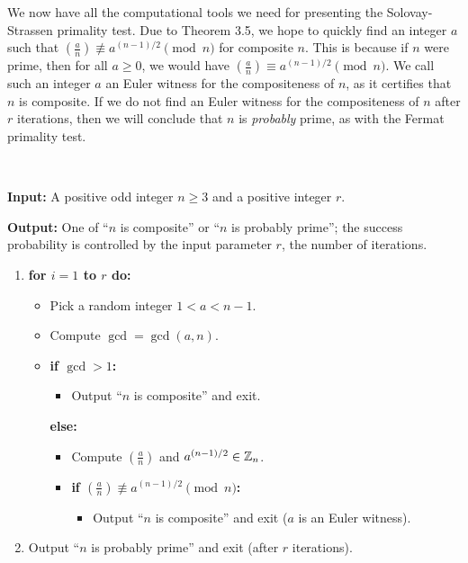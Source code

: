 We now have all the computational tools we need for presenting the Solovay-Strassen primality test. 
Due to Theorem 3.5, we hope to quickly find an integer $a$ such that $\left(\frac an \right) 
\not\equiv a^{(n-1)/2} \pmod n$ for composite $n$. This is because if $n$ were prime, then
for all $a \geq 0$, we would have $\left( \frac an \right) \equiv a^{(n-1)/2} \pmod n$.
We call such an integer $a$ an Euler witness for 
the compositeness of $n$, as it certifies that $n$ is composite. If we do not find an Euler 
witness for the compositeness of $n$ after $r$ iterations, then we will conclude that 
$n$ is {\it probably} prime, as with the Fermat primality test. 

\begin{algo}~

{\bf Input:} A positive odd integer $n \geq 3$ and a positive integer $r$. 

{\bf Output:} One of ``$n$ is composite'' or ``$n$ is probably prime''; the 
success probability is controlled by the input parameter $r$, the number of 
iterations. 
\begin{enumerate}
    \item {\bf for $i = 1$ to $r$ do:}
    \begin{itemize}
        \item Pick a random integer $1 < a < n-1$. 
        \item Compute $\gcd = \gcd(a, n)$. 
        \item {\bf if $\gcd > 1$:}
        \begin{itemize}[$\circ$]
            \item Output ``$n$ is composite'' and exit.
        \end{itemize}
        {\bf else:}
        \begin{itemize}[$\circ$]
            \item Compute $\left( \frac an \right)$ and $a^{(n-1)/2} \in \mathbb{Z}_n$. 
            \item {\bf if $\left( \frac an \right) \not\equiv a^{(n-1)/2} \pmod n$:}
            \begin{itemize}[--]
                \item Output ``$n$ is composite'' and exit ($a$ is an Euler witness).
            \end{itemize}
        \end{itemize}
    \end{itemize}
    \item Output ``$n$ is probably prime'' and exit (after $r$ iterations).
\end{enumerate}
\end{algo}


